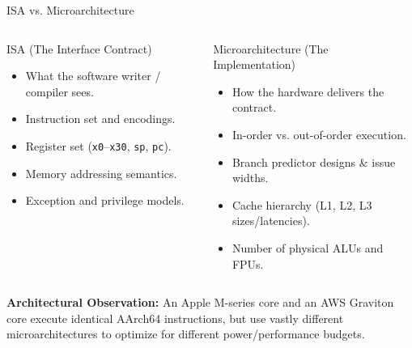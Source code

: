 \documentclass[aspectratio=169,11pt]{beamer}
\newcommand{\key}[1]{\textbf{#1}}
\newcommand{\bits}[1]{\texttt{#1}}
\begin{document}
\begin{frame}{ISA vs. Microarchitecture}

\begin{columns}[T,onlytextwidth]

\begin{block}{ISA (The Interface Contract)}
\begin{itemize}
  \item What the software writer / compiler sees.
  \item Instruction set and encodings.
  \item Register set (\bits{x0}--\bits{x30}, \bits{sp}, \bits{pc}).
  \item Memory addressing semantics.
  \item Exception and privilege models.
\end{itemize}
\end{block}

\begin{block}{Microarchitecture (The Implementation)}
\begin{itemize}
  \item How the hardware delivers the contract.
  \item In-order vs. out-of-order execution.
  \item Branch predictor designs \& issue widths.
  \item Cache hierarchy (L1, L2, L3 sizes/latencies).
  \item Number of physical ALUs and FPUs.
\end{itemize}
\end{block}

\end{columns}

\vspace{0.6em}
\key{Architectural Observation:} An Apple M-series core and an AWS Graviton core execute identical AArch64 instructions, but use vastly different microarchitectures to optimize for different power/performance budgets.

\end{frame}

\end{document}
